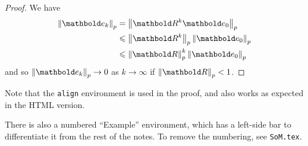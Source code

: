 \begin{proof}
  We have
  \begin{align*}
    \norm{\vect{e}_k}_p &= \norm{\mat{R}^k \vect{e}_0}_p \\
    &\leqslant \norm{\mat{R}^k}_p \norm{\vect{e}_0}_p \\
    &\leqslant \norm{\mat{R}}_p^k \norm{\vect{e}_0}_p 
  \end{align*}
  and so $\norm{\vect{e}_k}_p \to 0$ as $k \to \infty$ if $\norm{\mat{R}}_p < 1$. \qedhere
\end{proof}

Note that the \verb|align| environment is used in the proof, and also works as expected in the HTML version.

There is also a numbered ``Example'' environment, which has a left-side bar to differentiate it from the rest of the notes. To remove the numbering, see \verb|SoM.tex|.

